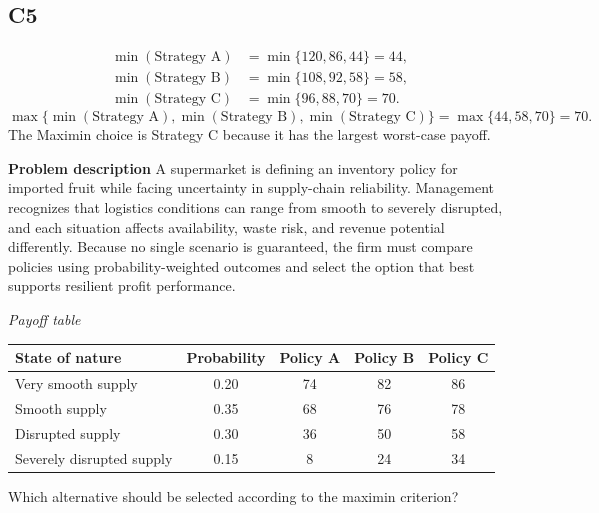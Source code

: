 \begin{ExamProblems}
		\subsection*{C5}
			\[
			\begin{aligned}
			\min(\text{Strategy A}) &= \min\{120,86,44\} = 44,\\
			\min(\text{Strategy B}) &= \min\{108,92,58\} = 58,\\
			\min(\text{Strategy C}) &= \min\{96,88,70\} = 70.
			\end{aligned}
			\]
			\[
			\max\{\min(\text{Strategy A}), \min(\text{Strategy B}), \min(\text{Strategy C})\}
			= \max\{44, 58, 70\}
			= 70.
			\]
			The Maximin choice is Strategy C because it has the largest worst-case payoff.
		\item
		\textbf{Problem description}
		A supermarket is defining an inventory policy for imported fruit while facing uncertainty in supply-chain reliability. Management recognizes that logistics conditions can range from smooth to severely disrupted, and each situation affects availability, waste risk, and revenue potential differently. Because no single scenario is guaranteed, the firm must compare policies using probability-weighted outcomes and select the option that best supports resilient profit performance.

		\begin{center}
			\textit{Payoff table} \par
			\begin{tabular}{l c c c c}
				\toprule
				State of nature & Probability & Policy A & Policy B & Policy C \\
				\midrule
				Very smooth supply & 0.20 & 74 & 82 & 86 \\
				Smooth supply & 0.35 & 68 & 76 & 78 \\
				Disrupted supply & 0.30 & 36 & 50 & 58 \\
				Severely disrupted supply & 0.15 & 8 & 24 & 34 \\
				\bottomrule
			\end{tabular}
		\end{center}

		Which alternative should be selected according to the maximin criterion?


\end{ExamProblems}
